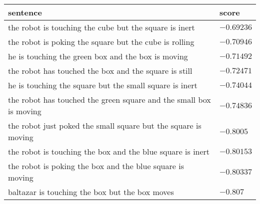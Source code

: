 \begin{table*}
    \centering
    \caption{.}
    \label{tab:conjunction:but}
    \begin{tabular}{ll}
    \toprule
    sentence & score \\
    \midrule
    the robot is touching the cube but the square is inert & $-0.69236$ \\
    the robot is poking the square but the cube is rolling & $-0.70946$ \\
    he is touching the green box and the box is moving & $-0.71492$ \\
    the robot has touched the box and the square is still & $-0.72471$ \\
    he is touching the square but the small square is inert & $-0.74044$ \\
    the robot has touched the green square and the small box is moving & $-0.74836$ \\
    the robot just poked the small square but the square is moving & $-0.8005$ \\
    the robot is touching the box and the blue square is inert & $-0.80153$ \\
    the robot is poking the box and the blue square is moving & $-0.80337$ \\
    baltazar is touching the box but the box moves & $-0.807$ \\
    \bottomrule
    \end{tabular}
\end{table*}
